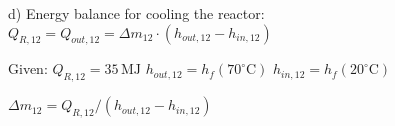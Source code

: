 d) Energy balance for cooling the reactor:  
\( Q_{R,12} = Q_{out,12} = \Delta m_{12} \cdot (h_{out,12} - h_{in,12}) \)  

Given:  
\( Q_{R,12} = 35 \, \text{MJ} \)  
\( h_{out,12} = h_f(70^\circ \text{C}) \)  
\( h_{in,12} = h_f(20^\circ \text{C}) \)  

\( \Delta m_{12} = Q_{R,12} / (h_{out,12} - h_{in,12}) \)